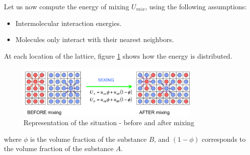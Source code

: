 \documentclass[../phys-f308.tex]{subfiles}
\begin{document}
\begin{example}
\begin{itemize}
        Let us now compute the energy of mixing $U_{mix}$, using the following assumptions:
        \begin{itemize}
            \item Intermolecular interaction energies.
            \item Molecules only interact with their nearest neighbors.
        \end{itemize}

        At each location of the lattice, figure \ref{fig: energy of mixing} shows how the energy is distributed.


        \begin{figure}[h!]
            \centering
            \includegraphics[width=90mm]{partA/Pictures/EnergyofMixing.png}
            \caption{Representation of the situation - before and after mixing}
            \label{fig: energy of mixing}
        \end{figure}
        where $\phi$ is the volume fraction of the substance $B$, and $(1-\phi)$ corresponds to the volume fraction of the substance $A$.\\


\end{itemize}
\end{example}
\end{document}
